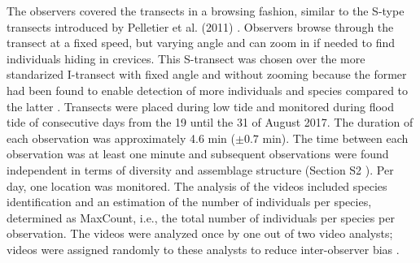 \documentclass[jmse,article,accept,moreauthors,pdftex]{Definitions/mdpi}
\begin{document}
The observers covered the transects in a browsing fashion, similar to the S-type transects introduced by Pelletier et al. (2011) \citep{Pelletier2011}. Observers browse through the transect at a fixed speed, but varying angle and can zoom in if needed to find individuals hiding in crevices. This S-transect was chosen over the more standarized I-transect with fixed angle and without zooming because the former had been found to enable detection of more individuals and species compared to the latter \citep{Pelletier2011}. Transects were placed during low tide and monitored during flood tide of consecutive days from the 19 until the 31 of August 2017. The duration of each observation was approximately 4.6 min ($\pm 0.7$ min). The time between each observation was at least one minute and subsequent observations were found independent in terms of diversity and assemblage structure ({Section S2}%
). Per day, one location was monitored. The analysis of the videos included species identification and an estimation of the number of individuals per species, determined as MaxCount, i.e., the total number of individuals per species per observation. The videos were analyzed once by one out of two video analysts; videos were assigned randomly to these analysts to reduce inter-observer bias \citep{Williams2006ImpactSurveys}. 
\end{document}
